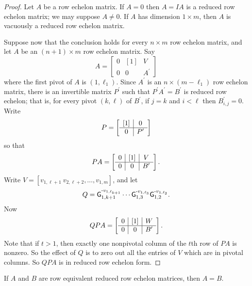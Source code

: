 \documentclass{memoir}
\begin{document}
\begin{proof}
Let $A$ be a row echelon matrix. If $A = 0$ then $A = IA$ is a reduced row echelon matrix; we may suppose $A \neq 0$. If $A$ has dimension $1 \times m$, then $A$ is vacuously a reduced row echelon matrix.

Suppose now that the conclusion holds for every $n \times m$ row echelon matrix, and let $A$ be an $(n+1) \times m$ row echelon matrix. Say \[ A = \left[ \begin{array}{c|c|c} 0 & [1] & V \\ \hline 0 & 0 & A^\prime \end{array} \right] \] where the first pivot of $A$ is $(1,\ell_1)$. Since $A^\prime$ is an $n \times (m-\ell_1)$ row echelon matrix, there is an invertible matrix $P^\prime$ such that $P^\prime A^\prime = B^\prime$ is reduced row echelon; that is, for every pivot $(k,\ell)$ of $B^\prime$, if $j = k$ and $i < \ell$ then $B^\prime_{i,j} = 0$. Write \[ P = \left[ \begin{array}{c|c} [1] & 0 \\ \hline 0 & P^\prime \end{array} \right] \] so that \[ PA = \left[ \begin{array}{c|c|c} 0 & [1] & V \\ \hline 0 & 0 & B^\prime \end{array} \right]. \] Write $V = [v_{1,\ell+1}\ v_{2,\ell+2}, \ldots, v_{1,m}]$, and let \[ Q = \mathsf{G}_{{1},{k+1}}^{\text{-}v_{1,\ell_{k+1}}} \cdots \mathsf{G}_{{1},{3}}^{\text{-}v_{1,\ell_3}} \mathsf{G}_{{1},{2}}^{\text{-}v_{1,\ell_2}}. \] Now \[ QPA = \left[ \begin{array}{c|c|c} 0 & [1] & W \\ \hline 0 & 0 & B^\prime \end{array} \right]. \] Note that if $t > 1$, then exactly one nonpivotal column of the $t$th row of $PA$ is nonzero. So the effect of $Q$ is to zero out all the entries of $V$ which are in pivotal columns. So $QPA$ is in reduced row echelon form.
\end{proof}

\begin{prp}
If $A$ and $B$ are row equivalent reduced row echelon matrices, then $A = B$.
\end{prp}
\end{document}

